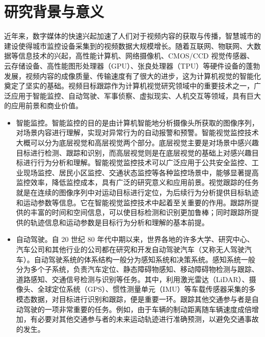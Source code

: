 \section{研究背景与意义}
近年来，数字媒体的快速兴起加速了人们对于视频内容的获取与传播，智慧城市的建设使得城市监控设备采集到的视频数据大规模增长。随着互联网、物联网、大数据等信息技术的兴起，高性能计算机、网络摄像机、CMOS/CCD 视觉传感器、云存储设备、高性能图形处理器（GPU）、张良处理器（TPU）等硬件设备的蓬勃发展，视频内容的成像质量、传输速度有了很大的进步，这为计算机视觉的智能化奠定了坚实的基础。视频目标跟踪作为计算机视觉研究领域中的重要技术之一，广泛应用于智能监控、自动驾驶、军事侦察、虚拟现实、人机交互等领域，具有巨大的应用前景和商业价值。
\begin{itemize}
\item 智能监控。智能监控的目的是由计算机智能地分析摄像头所获取的图像序列，对场景内容进行理解，实现对异常行为的自动报警和预警。智能视觉监控技术大概可以分为底层视觉和高层视觉两个部分。底层视觉主要是对场景中感兴趣目标进行检测、跟踪和识别，而高层视觉则是在底层视觉的基础上对感兴趣目标进行行为分析和理解。智能视觉监控技术可以广泛应用于公共安全监控、工业现场监控、居民小区监控、交通状态监控等各种监控场景中，能够显著提高监控效率，降低监控成本，具有广泛的研究意义和应用前景。视觉跟踪的任务就是在连续的图像序列中对运动目标进行定位，为后续行为分析提供目标轨迹和运动参数等信息。它在智能视觉监控技术中起着至关重要的作用。跟踪所提供的丰富的时间和空间信息，可以使目标检测和识别更加鲁棒；同时跟踪所提供的轨迹信息和运动参数是目标行为分析和理解的基本前提。
\item 自动驾驶。自 20 世纪 80 年代中期以来，世界各地的许多大学、研究中心、汽车公司和其他行业的公司都在研究和开发自动驾驶汽车（又称无人驾驶汽车）。自动驾驶系统的体系结构一般分为感知系统和决策系统。感知系统一般分为多个子系统，负责汽车定位、静态障碍物感知、移动障碍物检测与跟踪、道路感知、交通信号检测与识别等任务。其中，利用激光雷达（LiDAR）、摄像头、全球定位系统（GPS）、惯性测量单元（IMU）等车载传感器采集的多模态数据，对目标进行识别和跟踪，便是重要一环。跟踪其他交通参与者是自动驾驶的一项非常重要的任务。例如，由于车辆的制动距离随车辆速度成倍增加，有必要对其他交通参与者的未来运动轨迹进行准确预测，以避免交通事故的发生。

\end{itemize}
